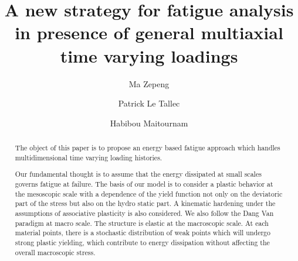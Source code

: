 \documentclass[3p,times,number,review]{elsarticle}
\begin{document}
\begin{frontmatter}



\title{A new strategy for fatigue analysis in presence of general multiaxial time varying loadings}




\author[a]{Ma Zepeng}
\author[b]{Patrick Le Tallec}
\author[c]{Habibou Maitournam}

\address[a]{Laboratory of Solid Mechanics, Ecole Polytechnique, 91128 Palaiseau Cedex, France}
\address[b]{Laboratory of Solid Mechanics, Ecole Polytechnique, 91128 Palaiseau Cedex, France}
\address[c]{IMSIA, ENSTA ParisTech, CNRS, CEA, EDF, Université Paris-Saclay, 828 bd des Maréchaux, 91762 Palaiseau cedex France}

\begin{abstract}
The object of this paper is to propose an energy based fatigue approach which handles multidimensional time varying loading histories.

Our fundamental thought is to assume that the energy dissipated at small scales governs fatigue at failure. The basis of our model is to consider a plastic behavior at the mesoscopic scale with a dependence of the yield function not only on the deviatoric part of the stress but also on the hydro static part. A kinematic hardening under the assumptions of associative plasticity is also considered. We also follow the Dang Van paradigm at macro scale. The structure is elastic at the macroscopic scale. At each material points, there is a stochastic distribution of weak points which will undergo strong plastic yielding, which contribute to energy dissipation without affecting the overall macroscopic stress.


\end{abstract}
\end{frontmatter}
\end{document}
